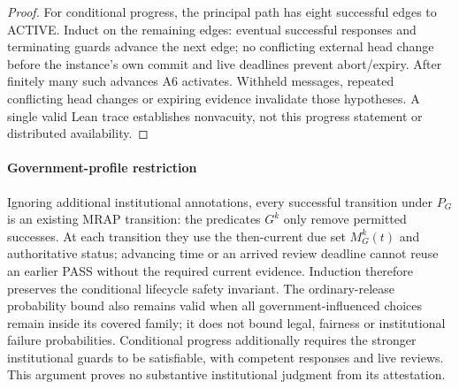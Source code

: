 \begin{proof}
For conditional progress, the principal path has eight successful edges to
ACTIVE. Induct on the remaining edges: eventual successful responses and
terminating guards advance the next edge; no conflicting external head change
before the instance's own commit and live deadlines
prevent abort/expiry. After finitely many such advances A6 activates.
Withheld messages, repeated conflicting head changes or expiring evidence
invalidate those hypotheses. A single valid Lean trace establishes
nonvacuity, not this progress statement or distributed availability.
\end{proof}

\paragraph{Government-profile restriction}
Ignoring additional institutional annotations, every successful transition
under $P_G$ is an existing MRAP transition: the predicates $G^k$ only remove
permitted successes. At each transition they use the then-current due set
$M_G^k(t)$ and authoritative status; advancing time or an arrived review
deadline cannot reuse an earlier PASS without the required current evidence.
Induction therefore preserves the conditional lifecycle
safety invariant. The ordinary-release probability bound also remains valid
when all government-influenced choices remain inside its covered family;
it does not bound legal, fairness or institutional failure probabilities.
Conditional progress additionally requires the stronger institutional guards
to be satisfiable, with competent responses and live reviews. This argument
proves no substantive institutional judgment from its attestation.

